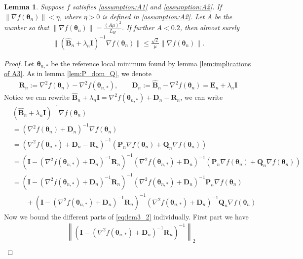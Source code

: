 \documentclass[11pt]{amsart}
\theoremstyle{plain}
\newtheorem{lemma}[theorem]{Lemma}
\theoremstyle{definition}
\theoremstyle{remark}
\def\D{\mathbf{D}}
\def\bQ{\mathbf{Q}}
\def\bE{\mathbf{E}}
\def\bP{\mathbf{P}}
\def\bR{\mathbf{R}}
\def\B{\mathbf{B}}
\def\param{\boldsymbol{\theta}}
\begin{document}
\begin{lemma}\label{lem:bound_beta}
Suppose $f$ satisfies \ref{assumption:A1} and \ref{assumption:A2}. If $\|\nabla f(\param_n)\|< \eta$, where $\eta>0$ is defined in \ref{assumption:A2}. Let $A$ be the number so that $\|\nabla f(\param_n)\|=\frac{(A\mu)^2}{L_H}$. If further $A<0.2$, then almost surely
\begin{align}\label{eq:bounded_beta_n}
\|(\hat{\B}_n+\lambda_n\mathbf{I})^{-1}\nabla f(\param_n)\|\leq \frac{\sqrt{2}}{\mu}\|\nabla f(\param_n)\|.
\end{align}
\end{lemma}
\begin{proof}
    Let $\param_{n,*}$ be the reference local minimum found by lemma \ref{lem:implications of A3}. As in lemma \ref{lem:P_dom_Q}, we denote
   \begin{align*}
   \bR_n:=\nabla^2f(\param_{n})-\nabla^2f(\param_{n,*}), \qquad  \D_n:=\hat{\B}_n-\nabla^2f(\param_n)=\bE_n+\lambda_n\mathbf{I}
   \end{align*}
   Notice we can rewrite $\hat{\B}_n+\lambda_n\mathbf{I}=\nabla^2f(\param_{n,*})+\D_n-\bR_n$, we can write
       \begin{align}\label{eq:lem3_2}
       &(\hat{\B}_n+\lambda_n\mathbf{I})^{-1}\nabla f(\param_n)\nonumber\\
       &=(\nabla^2f(\param_n)+\D_n)^{-1}\nabla f(\param_n)\nonumber\\
       &= \left(\nabla^2f(\param_{n,*})+\D_n-\bR_n\right)^{-1}(\bP_{n}\nabla f(\param_n)+\bQ_{n}\nabla f(\param_n))\nonumber\\
       &=\left(\mathbf{I}-\left(\nabla^2f(\param_{n,*})+\D_n\right)^{-1}\bR_n\right)^{-1}\left(\nabla^2f(\param_{n,*})+\D_n\right)^{-1}(\bP_{n}\nabla f(\param_n)+\bQ_{n}\nabla f(\param_n))\nonumber\\
       &=\left(\mathbf{I}-\left(\nabla^2f(\param_{n,*})+\D_n\right)^{-1}\bR_n\right)^{-1}\left(\nabla^2f(\param_{n,*})+\D_n\right)^{-1}\bP_{n}\nabla f(\param_n)\\
       &\quad\quad +\left(\mathbf{I}-\left(\nabla^2f(\param_{n,*})+\D_n\right)^{-1}\bR_n\right)^{-1}\left(\nabla^2f(\param_{n,*})+\D_n\right)^{-1}\bQ_{n}\nabla f(\param_n)\nonumber
   \end{align}
  Now we bound the different parts of \eqref{eq:lem3_2} individually.
  First part we have
  \begin{align*}
      &\left\|\left(\mathbf{I}-\left(\nabla^2f(\param_{n,*})+\D_n\right)^{-1}\bR_n\right)^{-1}\right\|_{2}\\

\end{align*}
\end{proof}
\end{document}
